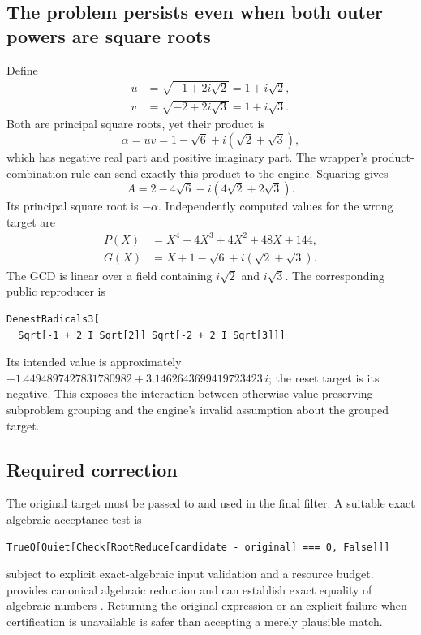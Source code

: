 \documentclass[11pt,letterpaper]{article}
\newcommand{\code}[1]{\texttt{\detokenize{#1}}}
\theoremstyle{definition}
\begin{document}
\subsection{The problem persists even when both outer powers are square roots}
Define
\begin{align}
 u&=\sqrt{-1+2i\sqrt2}=1+i\sqrt2,\\
 v&=\sqrt{-2+2i\sqrt3}=1+i\sqrt3.
\end{align}
Both are principal square roots, yet their product is
\begin{equation}\label{eq:productalpha}
 \alpha=uv=1-\sqrt6+i(\sqrt2+\sqrt3),
\end{equation}
which has negative real part and positive imaginary part. The wrapper's
product-combination rule can send exactly this product to the engine. Squaring gives
\begin{equation}
 A=2-4\sqrt6-i(4\sqrt2+2\sqrt3).
\end{equation}
Its principal square root is $-\alpha$. Independently computed values for the
wrong target are
\begin{align}
 P(X)&=X^4+4X^3+4X^2+48X+144,\\
 G(X)&=X+1-\sqrt6+i(\sqrt2+\sqrt3).
\end{align}
The GCD is linear over a field containing $i\sqrt2$ and $i\sqrt3$. The corresponding
public reproducer is
\begin{lstlisting}
DenestRadicals3[
  Sqrt[-1 + 2 I Sqrt[2]] Sqrt[-2 + 2 I Sqrt[3]]]
\end{lstlisting}
Its intended value is approximately
$-1.4494897427831780982+3.1462643699419723423\,i$; the reset target is its negative.
This exposes the interaction between otherwise value-preserving subproblem grouping
and the engine's invalid assumption about the grouped target.

\subsection{Required correction}
The original target must be passed to \code{trymultiplier} and used in the final
filter. A suitable exact algebraic acceptance test is
\begin{lstlisting}
TrueQ[Quiet[Check[RootReduce[candidate - original] === 0, False]]]
\end{lstlisting}
subject to explicit exact-algebraic input validation and a resource budget.
\code{RootReduce} provides canonical algebraic reduction and can establish exact
equality of algebraic numbers \cite{rootreduce}. Returning the original expression
or an explicit failure when certification is unavailable is safer than accepting a
merely plausible match.
\end{document}
